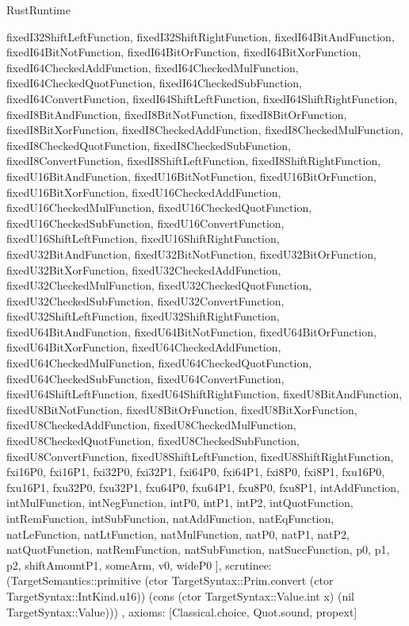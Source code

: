\begin{lexlean}{RustRuntime}
\begin{semanticmodule}
{{      fixedI32ShiftLeftFunction,
      fixedI32ShiftRightFunction,
      fixedI64BitAndFunction,
      fixedI64BitNotFunction,
      fixedI64BitOrFunction,
      fixedI64BitXorFunction,
      fixedI64CheckedAddFunction,
      fixedI64CheckedMulFunction,
      fixedI64CheckedQuotFunction,
      fixedI64CheckedSubFunction,
      fixedI64ConvertFunction,
      fixedI64ShiftLeftFunction,
      fixedI64ShiftRightFunction,
      fixedI8BitAndFunction,
      fixedI8BitNotFunction,
      fixedI8BitOrFunction,
      fixedI8BitXorFunction,
      fixedI8CheckedAddFunction,
      fixedI8CheckedMulFunction,
      fixedI8CheckedQuotFunction,
      fixedI8CheckedSubFunction,
      fixedI8ConvertFunction,
      fixedI8ShiftLeftFunction,
      fixedI8ShiftRightFunction,
      fixedU16BitAndFunction,
      fixedU16BitNotFunction,
      fixedU16BitOrFunction,
      fixedU16BitXorFunction,
      fixedU16CheckedAddFunction,
      fixedU16CheckedMulFunction,
      fixedU16CheckedQuotFunction,
      fixedU16CheckedSubFunction,
      fixedU16ConvertFunction,
      fixedU16ShiftLeftFunction,
      fixedU16ShiftRightFunction,
      fixedU32BitAndFunction,
      fixedU32BitNotFunction,
      fixedU32BitOrFunction,
      fixedU32BitXorFunction,
      fixedU32CheckedAddFunction,
      fixedU32CheckedMulFunction,
      fixedU32CheckedQuotFunction,
      fixedU32CheckedSubFunction,
      fixedU32ConvertFunction,
      fixedU32ShiftLeftFunction,
      fixedU32ShiftRightFunction,
      fixedU64BitAndFunction,
      fixedU64BitNotFunction,
      fixedU64BitOrFunction,
      fixedU64BitXorFunction,
      fixedU64CheckedAddFunction,
      fixedU64CheckedMulFunction,
      fixedU64CheckedQuotFunction,
      fixedU64CheckedSubFunction,
      fixedU64ConvertFunction,
      fixedU64ShiftLeftFunction,
      fixedU64ShiftRightFunction,
      fixedU8BitAndFunction,
      fixedU8BitNotFunction,
      fixedU8BitOrFunction,
      fixedU8BitXorFunction,
      fixedU8CheckedAddFunction,
      fixedU8CheckedMulFunction,
      fixedU8CheckedQuotFunction,
      fixedU8CheckedSubFunction,
      fixedU8ConvertFunction,
      fixedU8ShiftLeftFunction,
      fixedU8ShiftRightFunction,
      fxi16P0,
      fxi16P1,
      fxi32P0,
      fxi32P1,
      fxi64P0,
      fxi64P1,
      fxi8P0,
      fxi8P1,
      fxu16P0,
      fxu16P1,
      fxu32P0,
      fxu32P1,
      fxu64P0,
      fxu64P1,
      fxu8P0,
      fxu8P1,
      intAddFunction,
      intMulFunction,
      intNegFunction,
      intP0,
      intP1,
      intP2,
      intQuotFunction,
      intRemFunction,
      intSubFunction,
      natAddFunction,
      natEqFunction,
      natLeFunction,
      natLtFunction,
      natMulFunction,
      natP0,
      natP1,
      natP2,
      natQuotFunction,
      natRemFunction,
      natSubFunction,
      natSuccFunction,
      p0,
      p1,
      p2,
      shiftAmountP1,
      someArm,
      v0,
      wideP0
    ],
    scrutinee: (TargetSemantics::primitive (ctor TargetSyntax::Prim.convert (ctor TargetSyntax::IntKind.u16)) (cons (ctor TargetSyntax::Value.int x) (nil TargetSyntax::Value)))
  },
  axioms: [Classical.choice, Quot.sound, propext]
}


\end{semanticmodule}
\end{lexlean}

